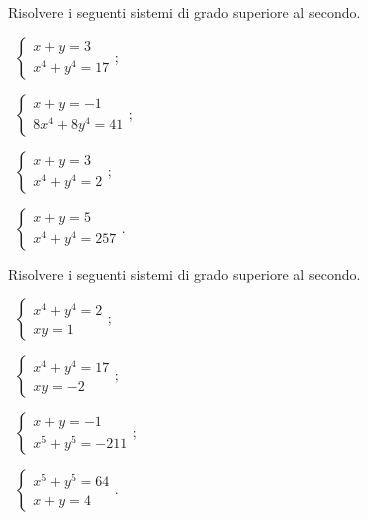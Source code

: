 \begin{esercizio}[\Ast]
 \label{ese:6.38}
Risolvere i seguenti sistemi di grado superiore al secondo.
\begin{multicols}{2}
 \begin{enumeratea}
 \item~$\left\{\begin{array}{l}{x+y=3}\\{x^4+y^4=17}\end{array}\right.$;
 \item~$\left\{\begin{array}{l}{x+y=-1}\\{8x^4+8y^4=41}\end{array}\right.$;
 \item~$\left\{\begin{array}{l}{x+y=3}\\{x^4+y^4=2}\end{array}\right.$;
 \item~$\left\{\begin{array}{l}{x+y=5}\\{x^4+y^4=257}\end{array}\right.$.
 \end{enumeratea}
 \end{multicols}
\end{esercizio}

\begin{esercizio}[\Ast]
 \label{ese:6.39}
Risolvere i seguenti sistemi di grado superiore al secondo.
\begin{multicols}{2}
 \begin{enumeratea}
 \item~$\left\{\begin{array}{l}x^4+y^4=2\\xy=1\end{array}\right.$;
 \item~$\left\{\begin{array}{l}x^4+y^4=17\\xy=-2\end{array}\right.$;
 \item~$\left\{\begin{array}{l}{x+y=-1}\\{x^5+y^5=-211}\end{array}\right.$;
 \item~$\left\{\begin{array}{l}x^5+y^5=64\\x+y=4\end{array}\right.$.
 \end{enumeratea}
 \end{multicols}
\end{esercizio}

